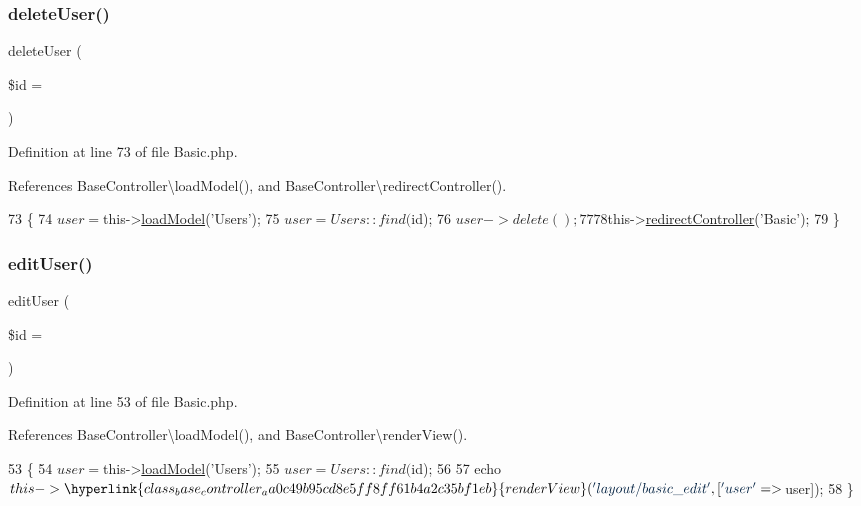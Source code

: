 \subsubsection{\texorpdfstring{delete\+User()}{deleteUser()}}
{\footnotesize\ttfamily delete\+User (\begin{DoxyParamCaption}\item[{}]{\$id = {\ttfamily \textquotesingle{}\textquotesingle{}} }\end{DoxyParamCaption})}



Definition at line 73 of file Basic.\+php.



References Base\+Controller\textbackslash{}load\+Model(), and Base\+Controller\textbackslash{}redirect\+Controller().


\begin{DoxyCode}
73                                          \{
74         $user = $this->\hyperlink{class_base_controller_a5fa8890bd3a9d20f5c0cc2377dc49eb1}{loadModel}(\textcolor{stringliteral}{'Users'});
75         $user = Users::find($id);
76         $user->delete();
77 
78         $this->\hyperlink{class_base_controller_a85ddb683efc64655be063b697f631beb}{redirectController}(\textcolor{stringliteral}{'Basic'});
79     \}
\end{DoxyCode}
\hypertarget{class_basic_acd3b430aeceba0ebbda62330838d0c0b}{}\label{class_basic_acd3b430aeceba0ebbda62330838d0c0b} 
\subsubsection{\texorpdfstring{edit\+User()}{editUser()}}
{\footnotesize\ttfamily edit\+User (\begin{DoxyParamCaption}\item[{}]{\$id = {\ttfamily \textquotesingle{}\textquotesingle{}} }\end{DoxyParamCaption})}



Definition at line 53 of file Basic.\+php.



References Base\+Controller\textbackslash{}load\+Model(), and Base\+Controller\textbackslash{}render\+View().


\begin{DoxyCode}
53                                        \{
54         $user = $this->\hyperlink{class_base_controller_a5fa8890bd3a9d20f5c0cc2377dc49eb1}{loadModel}(\textcolor{stringliteral}{'Users'});
55         $user = Users::find($id);
56 
57         echo $this->\hyperlink{class_base_controller_aa0c49b95cd8e5ff8ff61b4a2c35bf1eb}{renderView}(\textcolor{stringliteral}{'layout/basic\_edit'}, [\textcolor{stringliteral}{'user'} => $user]);
58     \}
\end{DoxyCode}
\hypertarget{class_basic_a445a1f2f42c756bf451de087e36b7193}{}\label{class_basic_a445a1f2f42c756bf451de087e36b7193} 
